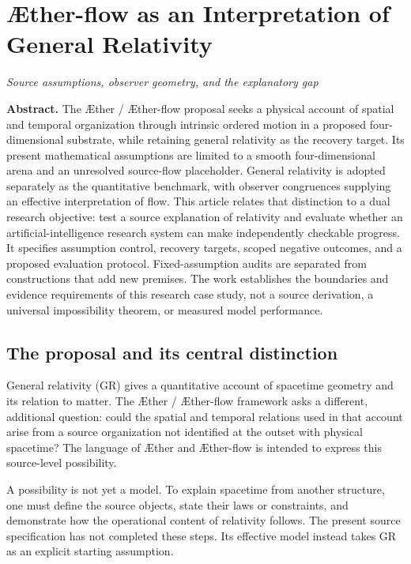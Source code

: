 \documentclass[11pt,oneside]{report}
\newcommand{\ArticleShort}{}
\newcommand{\Aether}{\AE{}ther}
\newcommand{\Aflow}{\AE{}ther-flow}
\newcommand{\TheoryProgram}{\Aether{} / \Aflow{} framework}
\theoremstyle{remark}
\numberwithin{definition}{chapter}
\numberwithin{proposition}{chapter}
\numberwithin{remark}{chapter}
\newcommand{\ChapterAbstract}[1]{%
  \begingroup
  \setlength{\parindent}{0pt}%
  \small\textbf{Abstract.} #1\par
  \endgroup
  \vspace{0.55\baselineskip}%
}
\begin{document}
\clearpage
\renewcommand{\ArticleShort}{Interpretation}
\chapter{\Aflow{} as an Interpretation of General Relativity}
\label{chapter:exact_closure_flagship_article}
{\noindent\normalsize\itshape Source assumptions, observer geometry, and the explanatory gap\par}\vspace{0.55\baselineskip}
\ChapterAbstract{The \Aether{} / \Aflow{} proposal seeks a physical account of spatial and temporal organization through intrinsic ordered motion in a proposed four-dimensional substrate, while retaining general relativity as the recovery target. Its present mathematical assumptions are limited to a smooth four-dimensional arena and an unresolved source-flow placeholder. General relativity is adopted separately as the quantitative benchmark, with observer congruences supplying an effective interpretation of flow. This article relates that distinction to a dual research objective: test a source explanation of relativity and evaluate whether an artificial-intelligence research system can make independently checkable progress. It specifies assumption control, recovery targets, scoped negative outcomes, and a proposed evaluation protocol. Fixed-assumption audits are separated from constructions that add new premises. The work establishes the boundaries and evidence requirements of this research case study, not a source derivation, a universal impossibility theorem, or measured model performance.}

\section{The proposal and its central distinction}
General relativity (GR) gives a quantitative account of spacetime geometry and its relation to matter. The \TheoryProgram{} asks a different, additional question: could the spatial and temporal relations used in that account arise from a source organization not identified at the outset with physical spacetime? The language of \Aether{} and \Aflow{} is intended to express this source-level possibility.

A possibility is not yet a model. To explain spacetime from another structure, one must define the source objects, state their laws or constraints, and demonstrate how the operational content of relativity follows. The present source specification has not completed these steps. Its effective model instead takes GR as an explicit starting assumption.
\end{document}

